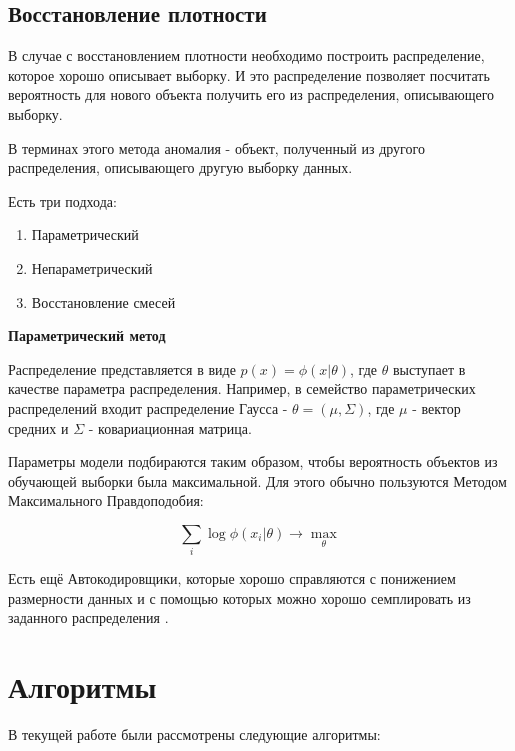 \subsection{Восстановление плотности}

В случае с восстановлением плотности необходимо построить распределение, которое хорошо описывает выборку. И это распределение позволяет посчитать вероятность для нового объекта получить его из распределения, описывающего выборку.

В терминах этого метода аномалия - объект, полученный из другого распределения, описывающего другую выборку данных.

\noindent Есть три подхода:
\begin{enumerate}
  \item Параметрический
  \item Непараметрический
  \item Восстановление смесей
\end{enumerate}

\noindent\textbf{Параметрический метод}

Распределение представляется в виде $p(x)=\phi(x\vert\theta)$, где $\theta$ выступает в качестве параметра распределения. Например, в семейство параметрических распределений входит распределение Гаусса - $\theta=(\mu, \Sigma)$, где $\mu$ - вектор средних и $\Sigma$ - ковариационная матрица.

Параметры модели подбираются таким образом, чтобы вероятность объектов из обучающей выборки была максимальной. Для этого обычно пользуются Методом Максимального Правдоподобия:

\[ \sum_{i}\log\phi(x_{i}\vert\theta) \rightarrow \max_{\theta} \]

Есть ещё Автокодировщики, которые хорошо справляются с понижением размерности данных и с помощью которых можно хорошо семплировать из заданного распределения \cite{karazeev}.

\section{Алгоритмы} \label{sec:ch2/sec4}

\noindent В текущей работе были рассмотрены следующие алгоритмы:

